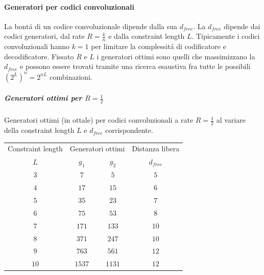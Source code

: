             \paragraph{Generatori per codici convoluzionali}
                La bontá di un codice convoluzionale dipende dalla sua $d_{free}$. La $d_{free}$ dipende
                dai codici generatori, dal rate $R= \frac{k}{n}$ e dalla constraint length $L$. Tipicamente i 
                codici convoluzionali hanno $k=1$ per limitare la complessitá di codificatore e decodificatore. 
                Fissato $R$ e $L$ i generatori ottimi sono quelli che massimizzano la $d_{free}$ e possono essere trovati 
                tramite una ricerca esaustiva fra tutte le possibili $\left(2^L\right)^n = 2^{nL}$ combinazioni.
                \subparagraph*{Generatori ottimi per $R = \frac{1}{2}$}
                    Generatori ottimi (in ottale) per codici convoluzionali a rate $R=\frac{1}{2}$ al variare 
                    della constraint length $L$ e $d_{free}$ corrispondente.
                    \begin{table}[H]
                        \centering
                        \begin{tabular}{cccc}
                        \cline{1-4}
                        Constraint length & \multicolumn{2}{l}{Generatori ottimi}& Distanza libera \\ \cline{1-4}
                        $L$        & $g_1$ &  $g_2$  &$d_{free}$\\\cline{1-4}
                        $3$ & $7$ &  $5$  &$5$\\
                        $4$ & $17$ &  $15$  &$6$\\
                        $5$ & $35$ &  $23$  &$7$\\
                        $6$ & $75$ &  $53$  &$8$\\
                        $7$ & $171$ &  $133$  &$10$\\
                        $8$ & $371$ &  $247$  &$10$\\
                        $9$ & $763$ &  $561$  &$12$\\ 
                        $10$ & $1537$ &  $1131$  &$12$
                        \end{tabular}
                    \end{table}

